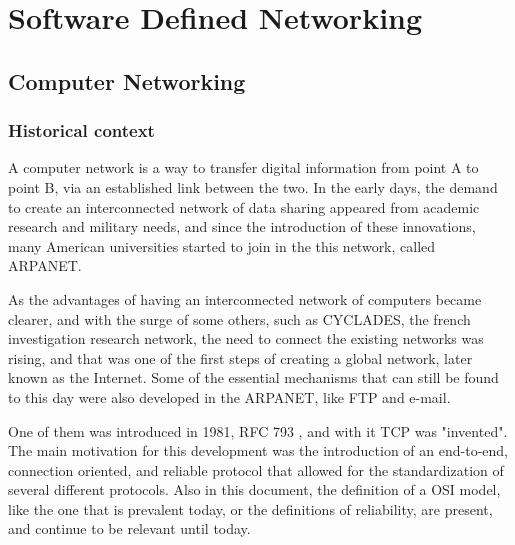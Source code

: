 \chapter{Software Defined Networking} \label{chap:sdn} %

\section {Computer Networking}

\subsection {Historical context}
\hspace {5mm} 

A computer network is a way to transfer digital information from point A to point B, via an established link
between the two. In the early days, the demand to create an interconnected network of data sharing 
appeared from academic research and military needs, and since the introduction of these innovations, many 
American universities started to join in the this network, called ARPANET.

\begin{figure}[!tbph]
  \centering
  \hfill
\end{figure}

\p As the advantages of having an interconnected network of computers became clearer, and with the surge of some others, 
such as CYCLADES, the french investigation research network, the need to connect the existing networks was rising, 
and that was one of the first steps of creating a global network, later known as the Internet. Some of the essential mechanisms that can still be found to this day were also developed in the ARPANET, like FTP and e-mail.

\p One of them was introduced in 1981, RFC 793 \cite{postel_transmission_1981}, and with it TCP was "invented".
The main motivation for this development was the introduction of an end-to-end, connection oriented, and reliable protocol that allowed for the standardization of 
several different protocols. Also in this document, the definition of a OSI model, like the one that is prevalent today, or the definitions of reliability, are present, and continue
to be relevant until today.

